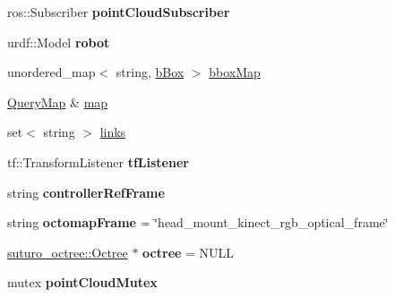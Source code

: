 \begin{DoxyCompactItemize}
\item 
\hypertarget{classCollisionScene_ae185f726a5ec8c68f92980eace1b613b}{ros\-::\-Subscriber {\bfseries point\-Cloud\-Subscriber}}\label{classCollisionScene_ae185f726a5ec8c68f92980eace1b613b}

\item 
\hypertarget{classCollisionScene_a09c519cf1c97e9e1c4d5d90197b8b404}{urdf\-::\-Model {\bfseries robot}}\label{classCollisionScene_a09c519cf1c97e9e1c4d5d90197b8b404}

\item 
unordered\-\_\-map$<$ string, \hyperlink{structCollisionScene_1_1bBox}{b\-Box} $>$ \hyperlink{classCollisionScene_a86929e1d07a315dec9e6c1b305cacabc}{bbox\-Map}
\item 
\hyperlink{classMutexMap}{Query\-Map} \& \hyperlink{classCollisionScene_a50300cec4b2a8bb3c3d51eef54acc0f8}{map}
\item 
set$<$ string $>$ \hyperlink{classCollisionScene_ab6fe95cec3f4207074aabedce8b4be61}{links}
\item 
\hypertarget{classCollisionScene_acf1bebb09bc150915efbb88ced9e3db1}{tf\-::\-Transform\-Listener {\bfseries tf\-Listener}}\label{classCollisionScene_acf1bebb09bc150915efbb88ced9e3db1}

\item 
\hypertarget{classCollisionScene_a59692641d55fc7b2c680429030749365}{string {\bfseries controller\-Ref\-Frame}}\label{classCollisionScene_a59692641d55fc7b2c680429030749365}

\item 
\hypertarget{classCollisionScene_a53afa27e7913804dfe9b77c72ff55c7a}{string {\bfseries octomap\-Frame} = \char`\"{}head\-\_\-mount\-\_\-kinect\-\_\-rgb\-\_\-optical\-\_\-frame\char`\"{}}\label{classCollisionScene_a53afa27e7913804dfe9b77c72ff55c7a}

\item 
\hypertarget{classCollisionScene_a7fae33d8e04f4b7db02b14e78220b9a4}{\hyperlink{classsuturo__octree_1_1Octree}{suturo\-\_\-octree\-::\-Octree} $\ast$ {\bfseries octree} = N\-U\-L\-L}\label{classCollisionScene_a7fae33d8e04f4b7db02b14e78220b9a4}

\item 
\hypertarget{classCollisionScene_a9957ef59711be6baa110dc8483c58afe}{mutex {\bfseries point\-Cloud\-Mutex}}\label{classCollisionScene_a9957ef59711be6baa110dc8483c58afe}

\end{DoxyCompactItemize}


